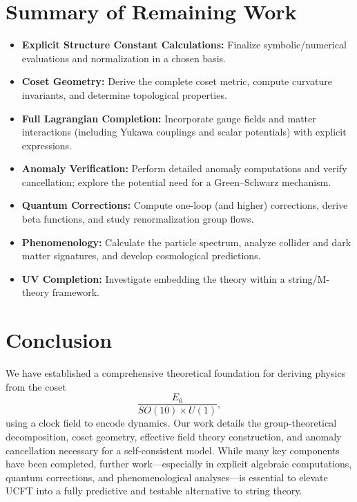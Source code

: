 \documentclass[aps,prd,preprint,groupedaddress]{revtex4-2}
\begin{document}
\section{Summary of Remaining Work}
\begin{itemize}
  \item \textbf{Explicit Structure Constant Calculations:} Finalize symbolic/numerical evaluations and normalization in a chosen basis.
  \item \textbf{Coset Geometry:} Derive the complete coset metric, compute curvature invariants, and determine topological properties.
  \item \textbf{Full Lagrangian Completion:} Incorporate gauge fields and matter interactions (including Yukawa couplings and scalar potentials) with explicit expressions.
  \item \textbf{Anomaly Verification:} Perform detailed anomaly computations and verify cancellation; explore the potential need for a Green--Schwarz mechanism.
  \item \textbf{Quantum Corrections:} Compute one-loop (and higher) corrections, derive beta functions, and study renormalization group flows.
  \item \textbf{Phenomenology:} Calculate the particle spectrum, analyze collider and dark matter signatures, and develop cosmological predictions.
  \item \textbf{UV Completion:} Investigate embedding the theory within a string/M-theory framework.
\end{itemize}

\section{Conclusion}
We have established a comprehensive theoretical foundation for deriving physics from the coset
\[
\frac{E_6}{SO(10)\times U(1)},
\]
using a clock field to encode dynamics. Our work details the group-theoretical decomposition, coset geometry, effective field theory construction, and anomaly cancellation necessary for a self-consistent model. While many key components have been completed, further work—especially in explicit algebraic computations, quantum corrections, and phenomenological analyses—is essential to elevate UCFT into a fully predictive and testable alternative to string theory.
\end{document}
